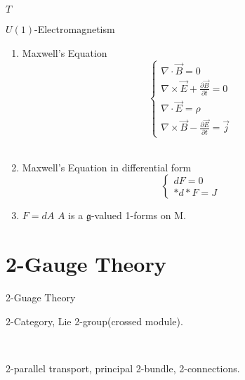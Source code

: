 \documentclass[12pt,aspectratio=53,mathserif]{beamer}
\begin{document}
\begin{frame}
    {$T$}
     \end{frame}


\begin{frame}{$U(1)$-Electromagnetism}         
    \begin{enumerate}
        \item Maxwell's Equation 
               $$ \begin{cases}
                    \nabla\cdot\vec{B}=0\\
                    \nabla\times\vec{E}+\frac{\partial\vec{B}}{\partial t}=0\\
                    \nabla\cdot\vec{E}=\rho \\
                    \nabla\times\vec{B}-\frac{\partial\vec{E}}{\partial t}=\vec{j}
                \end{cases}$$\\
                \item Maxwell's Equation in differential form
                $$\begin{cases}
                    dF=0\\
                    *d*F=J
                \end{cases}$$
        \item $F=dA$ $A$ is a $\mathfrak{g}$-valued 1-forms on M.
    \end{enumerate} 
\end{frame}


	\section{2-Gauge Theory}

\begin{frame}{2-Guage Theory}
    \begin{itemize}
        \begin{spacing}{2.0}
          
        \item %
       2-Category, Lie 2-group(crossed module).
        
        \ 
        
        \item 
         2-parallel transport, principal 2-bundle, 2-connections.
    \end{spacing}
    \end{itemize}
    
\end{frame}
	
\end{document}
